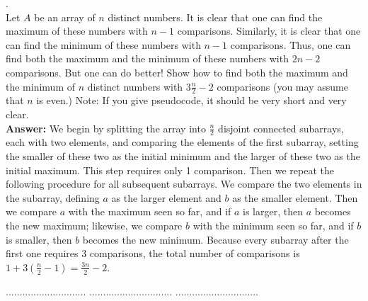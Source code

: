 \documentclass[a4paper,11pt]{article}
\begin{document}
. \\
Let $A$ be an array of $n$ distinct numbers.
It is clear that one can find the maximum of these numbers with $n\! - \! 1$ comparisons.
Similarly, it is clear that one can find the minimum of these numbers with $n\! - \! 1$ comparisons.
Thus, one can find both the maximum and the minimum of these numbers with $2n \! - \! 2$ comparisons. 
But one can do better! Show how to find both the maximum and the minimum of $n$ distinct numbers 
with $3\frac{n}{2}-2$ comparisons (you may assume that $n$ is even.)
Note: If you give pseudocode, it should be very short and very clear.\\
{\bf Answer:}
We begin by splitting the array into $\frac{n}{2}$ disjoint connected subarrays, each with two elements, and comparing the elements of the first subarray, setting the smaller of these two as the initial minimum and the larger of these two as the initial maximum. This step requires only 1 comparison. Then we repeat the following procedure for all subsequent subarrays. We compare the two elements in the subarray, defining $a$ as the larger element and $b$ as the smaller element. Then we compare $a$ with the maximum seen so far, and if $a$ is larger, then $a$ becomes the new maximum; likewise, we compare $b$ with the minimum seen so far, and if $b$ is smaller, then $b$ becomes the new minimum. Because every subarray after the first one requires 3 comparisons, the total number of comparisons is $1 + 3 \left( \frac{n}{2} - 1 \right) = \frac{3n}{2} - 2$.
 

 \pagebreak

 $.............................$
 $..............................$
          $..............................$\\

\bigskip
\end{document}

